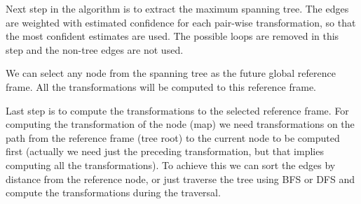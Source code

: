 Next step in the algorithm is to extract the maximum spanning tree. The edges are weighted with estimated confidence for each pair-wise transformation, so that the most confident estimates are used. The possible loops are removed in this step and the non-tree edges are not used.

We can select any node from the spanning tree as the future global reference frame. All the transformations will be computed to this reference frame.

Last step is to compute the transformations to the selected reference frame. For computing the transformation of the node (map) we need transformations on the path from the reference frame (tree root) to the current node to be computed first (actually we need just the preceding transformation, but that implies computing all the transformations). To achieve this we can sort the edges by distance from the reference node, or just traverse the tree using \gls{BFS} or \gls{DFS} and compute the transformations during the traversal.


